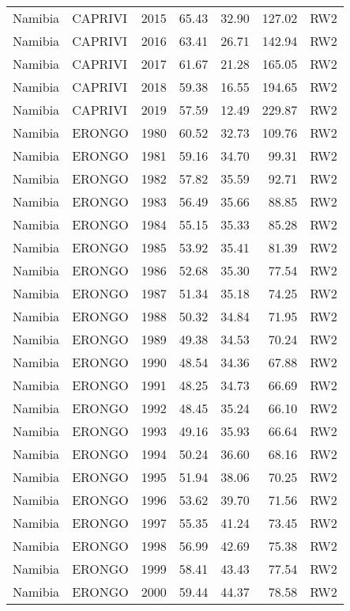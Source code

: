 \begin{longtable}{lllrrrl}
  Namibia & CAPRIVI & 2015 & 65.43 & 32.90 & 127.02 & RW2 \\ 
  Namibia & CAPRIVI & 2016 & 63.41 & 26.71 & 142.94 & RW2 \\ 
  Namibia & CAPRIVI & 2017 & 61.67 & 21.28 & 165.05 & RW2 \\ 
  Namibia & CAPRIVI & 2018 & 59.38 & 16.55 & 194.65 & RW2 \\ 
  Namibia & CAPRIVI & 2019 & 57.59 & 12.49 & 229.87 & RW2 \\ 
  Namibia & ERONGO & 1980 & 60.52 & 32.73 & 109.76 & RW2 \\ 
  Namibia & ERONGO & 1981 & 59.16 & 34.70 & 99.31 & RW2 \\ 
  Namibia & ERONGO & 1982 & 57.82 & 35.59 & 92.71 & RW2 \\ 
  Namibia & ERONGO & 1983 & 56.49 & 35.66 & 88.85 & RW2 \\ 
  Namibia & ERONGO & 1984 & 55.15 & 35.33 & 85.28 & RW2 \\ 
  Namibia & ERONGO & 1985 & 53.92 & 35.41 & 81.39 & RW2 \\ 
  Namibia & ERONGO & 1986 & 52.68 & 35.30 & 77.54 & RW2 \\ 
  Namibia & ERONGO & 1987 & 51.34 & 35.18 & 74.25 & RW2 \\ 
  Namibia & ERONGO & 1988 & 50.32 & 34.84 & 71.95 & RW2 \\ 
  Namibia & ERONGO & 1989 & 49.38 & 34.53 & 70.24 & RW2 \\ 
  Namibia & ERONGO & 1990 & 48.54 & 34.36 & 67.88 & RW2 \\ 
  Namibia & ERONGO & 1991 & 48.25 & 34.73 & 66.69 & RW2 \\ 
  Namibia & ERONGO & 1992 & 48.45 & 35.24 & 66.10 & RW2 \\ 
  Namibia & ERONGO & 1993 & 49.16 & 35.93 & 66.64 & RW2 \\ 
  Namibia & ERONGO & 1994 & 50.24 & 36.60 & 68.16 & RW2 \\ 
  Namibia & ERONGO & 1995 & 51.94 & 38.06 & 70.25 & RW2 \\ 
  Namibia & ERONGO & 1996 & 53.62 & 39.70 & 71.56 & RW2 \\ 
  Namibia & ERONGO & 1997 & 55.35 & 41.24 & 73.45 & RW2 \\ 
  Namibia & ERONGO & 1998 & 56.99 & 42.69 & 75.38 & RW2 \\ 
  Namibia & ERONGO & 1999 & 58.41 & 43.43 & 77.54 & RW2 \\ 
  Namibia & ERONGO & 2000 & 59.44 & 44.37 & 78.58 & RW2 \\ 

\end{longtable}
